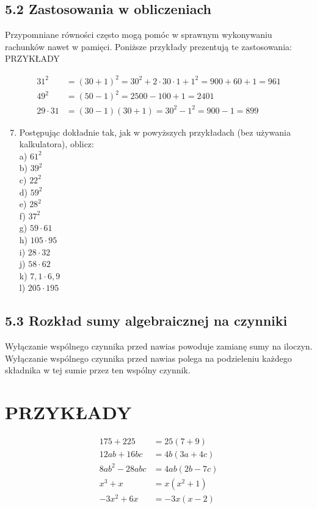 \documentclass[10pt]{article}
\begin{document}
\subsection*{5.2 Zastosowania w obliczeniach}
Przypomniane równości często mogą pomóc w sprawnym wykonywaniu rachunków nawet w pamięci. Poniższe przykłady prezentują te zastosowania: PRZYKŁADY

\[
\begin{aligned}
31^{2} & =(30+1)^{2}=30^{2}+2 \cdot 30 \cdot 1+1^{2}=900+60+1=961 \\
49^{2} & =(50-1)^{2}=2500-100+1=2401 \\
29 \cdot 31 & =(30-1)(30+1)=30^{2}-1^{2}=900-1=899
\end{aligned}
\]

\begin{enumerate}
  \setcounter{enumi}{6}
  \item Postępując dokładnie tak, jak w powyższych przykładach (bez używania kalkulatora), oblicz:\\
a) \(61^{2}\)\\
b) \(39^{2}\)\\
c) \(22^{2}\)\\
d) \(59^{2}\)\\
e) \(28^{2}\)\\
f) \(37^{2}\)\\
g) \(59 \cdot 61\)\\
h) \(105 \cdot 95\)\\
i) \(28 \cdot 32\)\\
j) \(58 \cdot 62\)\\
k) \(7,1 \cdot 6,9\)\\
l) \(205 \cdot 195\)
\end{enumerate}

\subsection*{5.3 Rozkład sumy algebraicznej na czynniki}
Wyłączanie wspólnego czynnika przed nawias powoduje zamianę sumy na iloczyn. Wyłączanie wspólnego czynnika przed nawias polega na podzieleniu każdego składnika w tej sumie przez ten wspólny czynnik.

\section*{PRZYKŁADY}
\[
\begin{aligned}
175+225 & =25(7+9) \\
12 a b+16 b c & =4 b(3 a+4 c) \\
8 a b^{2}-28 a b c & =4 a b(2 b-7 c) \\
x^{3}+x & =x\left(x^{2}+1\right) \\
-3 x^{2}+6 x & =-3 x(x-2)
\end{aligned}
\]
\end{document}
